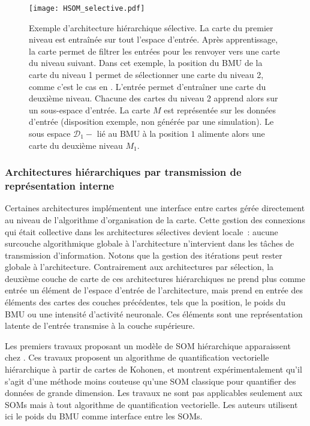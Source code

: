 \documentclass[../main]{subfiles}
\begin{document}
\begin{figure}
    \texttt{[image: HSOM\_selective.pdf]}
    \caption{Exemple d'architecture hiérarchique sélective. La carte du premier niveau est entraînée sur tout l'espace d'entrée. Après apprentissage, la carte permet de filtrer les entrées pour les renvoyer vers une carte du niveau suivant. Dans cet exemple, la position du BMU de la carte du niveau 1 permet de sélectionner une carte du niveau 2, comme c'est le cas en \cite{barbalho_hierarchical_2001}. 
    L'entrée permet d'entraîner une carte du deuxième niveau. Chacune des cartes du niveau 2 apprend alors sur un sous-espace d'entrée. La carte $M$ est représentée sur les données d'entrée (disposition exemple, non générée par une simulation). Le sous espace $\mathcal{D}_1-$ lié au BMU à la position $1$ alimente alors une carte du deuxième niveau $M_1$.
    \label{fig:hsom_selective}}
\end{figure}


\subsubsection{Architectures hiérarchiques par transmission de représentation interne}

Certaines architectures implémentent une interface entre cartes gérée directement au niveau de l'algorithme d'organisation de la carte.
Cette gestion des connexions qui était collective dans les architectures sélectives devient locale~: aucune surcouche algorithmique globale à l'architecture n'intervient dans les tâches de transmission d'information. Notons que la gestion des itérations peut rester globale à l'architecture.
Contrairement aux architectures par sélection, la deuxième couche de carte de ces architectures hiérarchiques ne prend plus comme entrée un élément de l'espace d'entrée de l'architecture, mais prend en entrée des éléments des cartes des couches précédentes, tels que la position, le poids du BMU ou une intensité d'activité neuronale. 
Ces éléments sont une représentation latente de l'entrée transmise à la couche supérieure.


Les premiers travaux proposant un modèle de SOM hiérarchique apparaissent chez \cite{luttrell_hierarchical_1989}. 
Ces travaux proposent un algorithme de quantification vectorielle hiérarchique à partir de cartes de Kohonen, et montrent expérimentalement qu'il s'agit d'une méthode moins couteuse qu'une SOM classique pour quantifier des données de grande dimension. Les travaux ne sont pas applicables seulement aux SOMs mais à tout algorithme de quantification vectorielle. Les auteurs utilisent ici le poids du BMU comme interface entre les SOMs.
\end{document}
